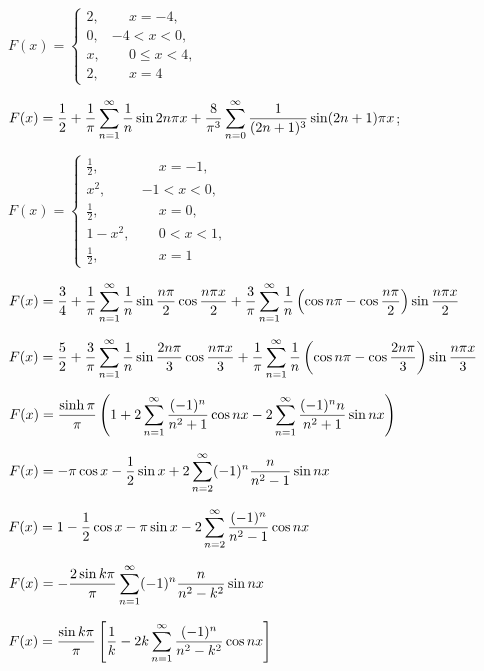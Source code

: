 \qquad $F(x)=
\left\{\begin{array}{cl}
2,&\phantom{-}x=-4,\\
0,&-4<x<0,\\
x,&\phantom{-}0\le x<4,\\
2,&\phantom{-}x=4
\end{array}\right.$

$F(x)=\displaystyle\frac{1}{2}+\frac{1}{\pi}\sum_{n=1}^{\infty}\frac{1}{n}\sin2n\pi x
+\frac{8}{\pi^{3}}\sum_{n=0}^{\infty}\frac{1}{(2n+1)^{3}}\sin(2n+1)\pi x$;

 \qquad $F(x)=
\left\{\begin{array}{cl}
{\frac{1}{2}},&\phantom{-}x=-1,\\
x^{2},&-1<x<0,\\
\frac{1}{2},&\phantom{-}x=0,\\
1-x^{2},&\phantom{-}0<x<1,\\
\frac{1}{2},&\phantom{-}x=1
\end{array}\right.$

$F(x)=\displaystyle\frac{3}{4}+\frac{1}{\pi}\sum_{n=1}^{\infty}
\frac{1}{n}\sin\frac{n\pi}{2}\cos\frac{n\pi x}{2}+\frac{3}{\pi}
\sum_{n=1}^{\infty}\frac{1}{n}\left(\cos
n\pi-\cos\frac{n\pi}{2}\right)\sin\frac{n\pi x}{2}$

 $F(x)=\displaystyle\frac{5}{2}+\frac{3}{\pi}\sum_{n=1}^{\infty}
\frac{1}{n}\sin\frac{2n\pi}{3}\cos\frac{n\pi x}{3}+\frac{1}{\pi}
\sum_{n=1}^{\infty}\frac{1}{n}\left(\cos
n\pi-\cos\frac{2n\pi}{3}\right)\sin\frac{n\pi x}{3}$

 $F(x)=\displaystyle\frac{\sinh\pi}{\pi}\left(
1+2\sum_{n=1}^{\infty}\frac{(-1)^{n}}{n^{2}+1}\cos
nx-2\sum_{n=1}^{\infty}\frac{(-1)^{n}n}{n^{2}+1}\sin nx\right)$

$F(x)=\displaystyle-\pi\cos x-\frac{1}{2}\sin x+2\sum_{n=2}^{\infty}
(-1)^{n}\frac{n}{n^{2}-1}\sin nx$

$F(x)=\displaystyle1-\frac{1}{2}\cos x-\pi\sin x-2\sum_{n=2}^{\infty}
\frac{(-1)^{n}}{n^{2}-1}\cos nx$

$F(x)=-\displaystyle\frac{2\sin k\pi}{\pi}\sum_{n=1}^{\infty}(-1)^{n}\frac{n}{n^{2}-k^{2}}\sin nx$

$F(x)=\displaystyle\frac{\sin
k\pi}{\pi}\left[\frac{1}{k}-2k\sum_{n=1}^{\infty}\frac{(-1)^{n}}{n^{2}-k^{2}}\cos nx\right]$

